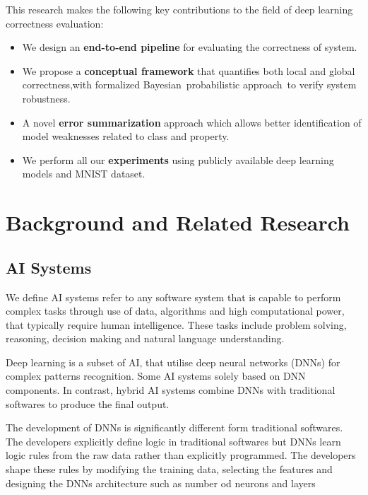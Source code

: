 \documentclass[10pt, conference, a4paper, final]{IEEEtran}
\begin{document}
This research makes the following key contributions to the field of deep learning correctness evaluation:
\begin{itemize}
   
    \item We design an \textbf{end-to-end pipeline} for evaluating the correctness of system.
    
    \item We propose a \textbf{conceptual framework} that quantifies both local  and global correctness,with formalized Bayesian probabilistic approach to verify system robustness.
    \item A novel \textbf{error summarization}  approach which allows better identification of model weaknesses related to class and property.

    \item We perform all our \textbf{experiments} using publicly available deep learning models and MNIST dataset.
\end{itemize}



\section{Background and Related Research}
\subsection{AI Systems}

We define AI systems refer to any software system that is capable to perform complex tasks through use of data, algorithms and high computational power, that typically require human intelligence. These tasks include problem solving, reasoning, decision making and natural language understanding.

Deep learning is a subset of AI, that utilise  deep neural networks (DNNs) for complex patterns recognition. Some AI systems solely based on DNN components. In contrast, hybrid AI systems combine DNNs with traditional softwares to produce the final output.

The development of DNNs is significantly different form traditional softwares. The developers explicitly define logic in traditional softwares but DNNs learn logic rules from the raw data rather than explicitly programmed. The developers shape these rules by modifying the training data, selecting the features and designing the DNNs architecture such as number od neurons and layers 
\end{document}
